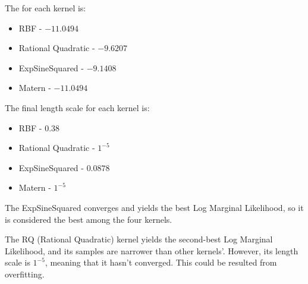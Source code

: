 \begin{solution}
    The  for each kernel is:

    \begin{itemize}
        \item { RBF - $-11.0494$ }
        \item { Rational Quadratic - $-9.6207$ }
        \item { ExpSineSquared - $-9.1408$ }
        \item { Matern - $-11.0494$ }
    \end{itemize}

    The final length scale for each kernel is:

    \begin{itemize}
        \item { RBF - $0.38$ }
        \item { Rational Quadratic - $1^{-5}$ }
        \item { ExpSineSquared - $0.0878$ }
        \item { Matern - $1^{-5}$ }
    \end{itemize}

    The ExpSineSquared converges and yields the best Log Marginal Likelihood, so it is considered the best among the four kernels.
    
    The RQ (Rational Quadratic) kernel yields the second-best Log Marginal Likelihood, and its samples are narrower than other kernels'.
    However, its length scale is $1^{-5}$, meaning that it hasn't converged.
    This could be resulted from overfitting.

\end{solution}